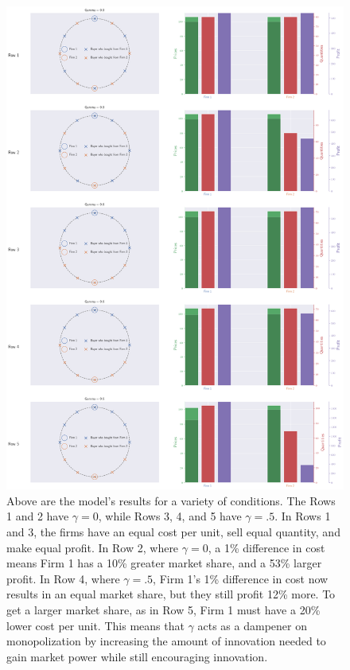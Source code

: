 \documentclass[11pt]{article}
\begin{document}
\begin{figure}[[p!htb] %
  \centering
  \vspace{-2cm} %
  \includegraphics[width=\linewidth]{5x2plot.png}
  \caption{\small{Above are the model's results for a variety of
  conditions. The Rows 1 and 2 have $\gamma=0$, while Rows 3, 4, and 5 have
  $\gamma = .5$. In Rows 1 and 3, the firms have an equal cost per unit, sell
  equal quantity, and make equal profit. In Row 2, where $\gamma=0$, a 1\%
  difference in cost means Firm 1 has a 10\% greater market share, and a 53\%
  larger profit.
  In Row 4, where $\gamma=.5$, Firm 1's 1\% difference in cost now results in
  an equal market share, but they still profit 12\% more. To get a larger
  market share, as in Row 5, Firm 1 must have a 20\% lower cost per unit. This
  means that $\gamma$ acts as a dampener on monopolization by increasing the
  amount of innovation needed to gain market power while still encouraging
  innovation. %
  }}
  \label{fig:fig3x2SingleTimestep}
\end{figure}
\end{document}
